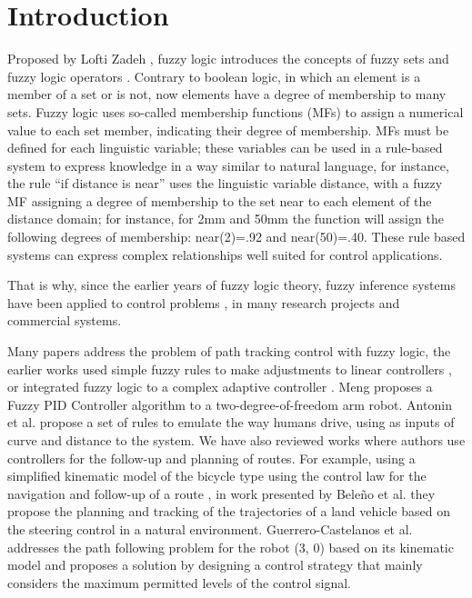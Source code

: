 \documentclass[symmetry,article,submit,moreauthors,pdftex]{Definitions/mdpi}
\begin{document}
\section{Introduction}

Proposed by Lofti Zadeh \cite{goguen_zadeh_1973}, fuzzy logic introduces the
concepts of fuzzy sets and fuzzy logic operators \cite{zadeh1996fuzzy}.
Contrary to boolean logic, in which an element is a member of a set or is not,
now elements have a degree of membership to many sets. Fuzzy logic uses
so-called membership functions (MFs) to assign a numerical value to each set
member, indicating their degree of membership. MFs must be defined for each
linguistic variable; these variables can be used in a rule-based system to
express knowledge in a way similar to natural language, for instance, the rule
``if distance is near'' uses the linguistic variable distance, with a fuzzy MF
assigning a degree of membership to the set near to each element of the
distance domain; for instance, for 2mm and 50mm the function will assign the
following degrees of membership: near(2)=.92 and near(50)=.40. These rule based
systems can express complex relationships well suited for control applications.

That is why, since the earlier years of fuzzy logic theory, fuzzy inference
systems \cite{driankov_introduction_2013} have been applied to control problems
\cite{mamdani1974application,king1977application,passino1998fuzzy,driankov_introduction_2013},
in many research projects \cite{yang_improved_2003,driankov_fuzzy_2013} and
commercial systems.

Many papers address the problem of path tracking control with fuzzy logic, the
earlier works used simple fuzzy rules to make adjustments to linear controllers
\cite{lee_practical_2003}, or integrated fuzzy logic to a complex adaptive
controller \cite{sanchez1997adaptive}. Meng \cite{bi_control_2020} proposes a
Fuzzy PID Controller %
algorithm to a two-degree-of-freedom arm robot. Antonin et al.
\cite{antonelli_fuzzy-logic-based_2007} propose a set of rules to emulate the
way humans drive, using as inputs of curve and distance to the system.  We have
also reviewed works where authors use controllers for the follow-up and
planning of routes. For example, using a simplified kinematic model of the
bicycle type using the control law for the navigation and follow-up of a route
\cite{laumond_robot_1998}, in work presented by Beleño et al.
\cite{beleno_planeacion_2014} they propose the planning and tracking of the
trajectories of a land vehicle based on the steering control in a natural
environment.  Guerrero-Castelanos et al.
\cite{guerrero-castellanos_trajectory_2014} addresses the path following
problem for the robot (3, 0) based on its kinematic model and proposes a
solution by designing a control strategy that mainly considers the maximum
permitted levels of the control signal. 
\end{document}
